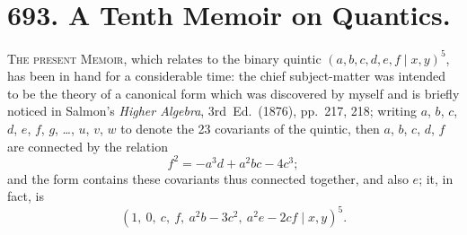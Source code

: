 \documentclass[11pt,a4paper]{book}
\begin{document}
\section*{693. A Tenth Memoir on Quantics.}
\label{paper:693}


\bigskip

\textsc{The present Memoir}, which relates to the binary quintic $(a, b, c, d, e, f \mid x, y)^5$, has been in hand for a considerable time: the chief subject-matter was intended to be the theory of a canonical form which was discovered by myself and is briefly noticed in Salmon's \textit{Higher Algebra}, 3rd~Ed.\ (1876), pp.~217, 218; writing $a$, $b$, $c$, $d$, $e$, $f$, $g$, \ldots, $u$, $v$, $w$ to denote the 23 covariants of the quintic, then $a$, $b$, $c$, $d$, $f$ are connected by the relation
\[
f^2 = -a^3 d + a^2 bc - 4c^3;
\]
and the form contains these covariants thus connected together, and also $e$; it, in fact, is
\[
(1,\ 0,\ c,\ f,\ a^2 b - 3c^2,\ a^2 e - 2cf \mid x, y)^5.
\]
\end{document}
